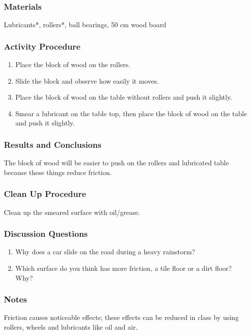 \subsubsection*{Materials}
Lubricants*, rollers*, ball bearings, 50 cm wood board

\subsubsection*{Activity Procedure}
\begin{enumerate}
\item{Place the block of wood on the rollers.} 
\item{Slide the block and observe how easily it moves.} 
\item{Place the block of wood on the table without rollers and push it slightly.} 
\item{Smear a lubricant on the table top, then place the block of wood on the table and push it slightly.} 
\end{enumerate}

\subsubsection*{Results and Conclusions}
The block of wood will be easier to push on the rollers and lubricated table because these things reduce friction.  

\subsubsection*{Clean Up Procedure}
Clean up the smeared surface with oil/grease.

\subsubsection*{Discussion Questions}
\begin{enumerate}
\item{Why does a car slide on the road during a heavy rainstorm?}
\item{Which surface do you think has more friction, a tile floor or a dirt floor? Why?}
\end{enumerate}

\subsubsection*{Notes}
Friction causes noticeable effects; these effects can be reduced in class by using rollers, wheels and lubricants like oil and air.



